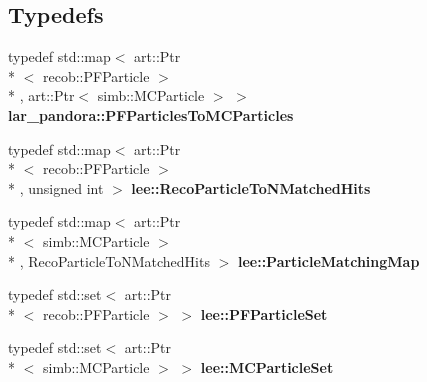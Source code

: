 \subsection*{Typedefs}
\begin{DoxyCompactItemize}
\item 
\hypertarget{group__lee_ga70b6dfa1b2176c8ecbee29c567946890}{typedef std\-::map$<$ art\-::\-Ptr\\*
$<$ recob\-::\-P\-F\-Particle $>$\\*
, art\-::\-Ptr$<$ simb\-::\-M\-C\-Particle $>$ $>$ {\bfseries lar\-\_\-pandora\-::\-P\-F\-Particles\-To\-M\-C\-Particles}}\label{group__lee_ga70b6dfa1b2176c8ecbee29c567946890}

\item 
\hypertarget{group__lee_ga1e4126ea41de810a723eb4c1023fb418}{typedef std\-::map$<$ art\-::\-Ptr\\*
$<$ recob\-::\-P\-F\-Particle $>$\\*
, unsigned int $>$ {\bfseries lee\-::\-Reco\-Particle\-To\-N\-Matched\-Hits}}\label{group__lee_ga1e4126ea41de810a723eb4c1023fb418}

\item 
\hypertarget{group__lee_gad68c1843c146182933b27bf7be0455a4}{typedef std\-::map$<$ art\-::\-Ptr\\*
$<$ simb\-::\-M\-C\-Particle $>$\\*
, Reco\-Particle\-To\-N\-Matched\-Hits $>$ {\bfseries lee\-::\-Particle\-Matching\-Map}}\label{group__lee_gad68c1843c146182933b27bf7be0455a4}

\item 
\hypertarget{group__lee_ga084ff379386cea31dbc631216b56b9eb}{typedef std\-::set$<$ art\-::\-Ptr\\*
$<$ recob\-::\-P\-F\-Particle $>$ $>$ {\bfseries lee\-::\-P\-F\-Particle\-Set}}\label{group__lee_ga084ff379386cea31dbc631216b56b9eb}

\item 
\hypertarget{group__lee_gab1ec016bd8fc6df09c6f95dba3962bba}{typedef std\-::set$<$ art\-::\-Ptr\\*
$<$ simb\-::\-M\-C\-Particle $>$ $>$ {\bfseries lee\-::\-M\-C\-Particle\-Set}}\label{group__lee_gab1ec016bd8fc6df09c6f95dba3962bba}

\end{DoxyCompactItemize}
